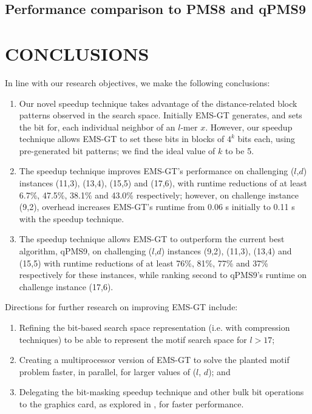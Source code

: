 \documentclass[oneside,12pt]{DISCSthesis}
\begin{document}
	\section{Performance comparison to PMS8 and qPMS9}


\chapter{CONCLUSIONS}
	In line with our research objectives, we make the following conclusions:

	\begin{enumerate}
	\item Our novel speedup technique takes advantage of the distance-related block patterns observed in the search space. Initially EMS-GT generates, and sets the bit for, each individual neighbor of an $l$-mer $x$. However, our speedup technique allows EMS-GT to set these bits in blocks of $4^k$ bits each, using pre-generated bit patterns; we find the ideal value of $k$ to be 5.
	\item The speedup technique improves EMS-GT's performance on challenging ($l$,$d$) instances (11,3), (13,4), (15,5) and (17,6), with runtime reductions of at least 6.7\%, 47.5\%, 38.1\% and 43.0\% respectively; however, on challenge instance (9,2), overhead increases EMS-GT's runtime from 0.06 s initially to 0.11 s with the speedup technique.
	\item The speedup technique allows EMS-GT to outperform the current best algorithm, qPMS9, on challenging ($l$,$d$) instances (9,2), (11,3), (13,4) and (15,5) with runtime reductions of at least 76\%, 81\%, 77\% and 37\% respectively for these instances, while ranking second to qPMS9's runtime on challenge instance (17,6).
	\end{enumerate}

	\noindent Directions for further research on improving EMS-GT include:

	\begin{enumerate}
	\item Refining the bit-based search space representation (i.e. with compression techniques) to be able to represent the motif search space for $l > 17$;
	\item Creating a multiprocessor version of EMS-GT to solve the planted motif problem faster, in parallel, for larger values of ($l$, $d$); and
	\item Delegating the bit-masking speedup technique and other bulk bit operations to the graphics card, as explored in \cite{dasari2010efficient}, for faster performance.
	\end{enumerate}


\BackMatter  %
	
	

\end{document}
